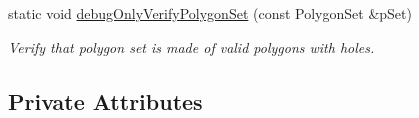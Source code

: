 \begin{DoxyCompactItemize}
\item 
\mbox{\label{classpepr3d_1_1_triangle_detail_a6b75cb4b0e71622fe4ffdafdedecf379}} 
static void \mbox{\hyperlink{classpepr3d_1_1_triangle_detail_a6b75cb4b0e71622fe4ffdafdedecf379}{debug\+Only\+Verify\+Polygon\+Set}} (const Polygon\+Set \&p\+Set)
\begin{DoxyCompactList}\small\item\em Verify that polygon set is made of valid polygons with holes. \end{DoxyCompactList}\end{DoxyCompactItemize}
\subsection*{Private Attributes}
